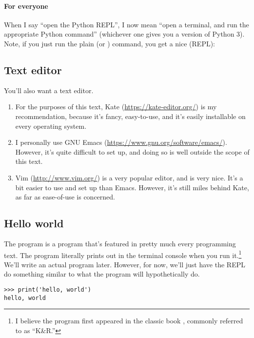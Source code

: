 \paragraph{For everyone}

When I say ``open the Python REPL'', I now mean ``open a terminal, and
run the appropriate Python command'' (whichever one gives you a
version of Python 3). Note, if you just run the plain 
(or ) command, you get a nice  (REPL):



\subsection{Text editor}

You'll also want a text editor.

\begin{enumerate}
\item For the purposes of this text, Kate
  (\url{https://kate-editor.org/}) is my recommendation, because it's
  fancy, easy-to-use, and it's easily installable on every operating
  system.
\item I personally use GNU Emacs
  (\url{https://www.gnu.org/software/emacs/}). However, it's quite
  difficult to set up, and doing so is well outside the scope of this
  text.
\item Vim (\url{http://www.vim.org/}) is a very popular editor, and is
  very nice. It's a bit easier to use and set up than Emacs. However,
  it's still miles behind Kate, as far as ease-of-use is concerned.
\end{enumerate}

\subsection{Hello world}

The  program is a program that's featured in pretty
much every programming text. The program literally prints out
 in the terminal console when you run
it.\footnote{I believe the program first appeared in the classic book
  , commonly referred to as ``K\&R.''} We'll write
an actual program later. However, for now, we'll just have the REPL do
something similar to what the program will hypothetically do.

\begin{lstlisting}
>>> print('hello, world')
hello, world
\end{lstlisting}

